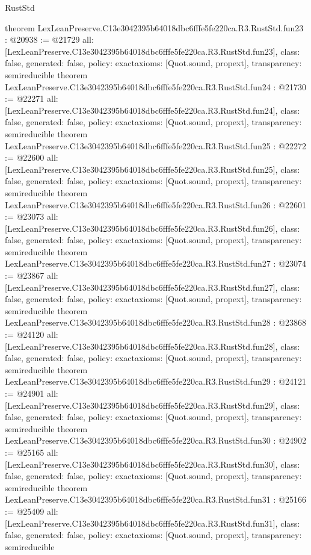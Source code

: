 \begin{lexlean}{RustStd}
\begin{coremodule}
{}
theorem LexLeanPreserve.C13e3042395b64018dbc6fffe5fe220ca.R3.RustStd.fun23 : @20938 := @21729 {
  all: [LexLeanPreserve.C13e3042395b64018dbc6fffe5fe220ca.R3.RustStd.fun23],
  class: false,
  generated: false,
  policy: exact{axioms: [Quot.sound, propext]},
  transparency: semireducible
}
theorem LexLeanPreserve.C13e3042395b64018dbc6fffe5fe220ca.R3.RustStd.fun24 : @21730 := @22271 {
  all: [LexLeanPreserve.C13e3042395b64018dbc6fffe5fe220ca.R3.RustStd.fun24],
  class: false,
  generated: false,
  policy: exact{axioms: [Quot.sound, propext]},
  transparency: semireducible
}
theorem LexLeanPreserve.C13e3042395b64018dbc6fffe5fe220ca.R3.RustStd.fun25 : @22272 := @22600 {
  all: [LexLeanPreserve.C13e3042395b64018dbc6fffe5fe220ca.R3.RustStd.fun25],
  class: false,
  generated: false,
  policy: exact{axioms: [Quot.sound, propext]},
  transparency: semireducible
}
theorem LexLeanPreserve.C13e3042395b64018dbc6fffe5fe220ca.R3.RustStd.fun26 : @22601 := @23073 {
  all: [LexLeanPreserve.C13e3042395b64018dbc6fffe5fe220ca.R3.RustStd.fun26],
  class: false,
  generated: false,
  policy: exact{axioms: [Quot.sound, propext]},
  transparency: semireducible
}
theorem LexLeanPreserve.C13e3042395b64018dbc6fffe5fe220ca.R3.RustStd.fun27 : @23074 := @23867 {
  all: [LexLeanPreserve.C13e3042395b64018dbc6fffe5fe220ca.R3.RustStd.fun27],
  class: false,
  generated: false,
  policy: exact{axioms: [Quot.sound, propext]},
  transparency: semireducible
}
theorem LexLeanPreserve.C13e3042395b64018dbc6fffe5fe220ca.R3.RustStd.fun28 : @23868 := @24120 {
  all: [LexLeanPreserve.C13e3042395b64018dbc6fffe5fe220ca.R3.RustStd.fun28],
  class: false,
  generated: false,
  policy: exact{axioms: [Quot.sound, propext]},
  transparency: semireducible
}
theorem LexLeanPreserve.C13e3042395b64018dbc6fffe5fe220ca.R3.RustStd.fun29 : @24121 := @24901 {
  all: [LexLeanPreserve.C13e3042395b64018dbc6fffe5fe220ca.R3.RustStd.fun29],
  class: false,
  generated: false,
  policy: exact{axioms: [Quot.sound, propext]},
  transparency: semireducible
}
theorem LexLeanPreserve.C13e3042395b64018dbc6fffe5fe220ca.R3.RustStd.fun30 : @24902 := @25165 {
  all: [LexLeanPreserve.C13e3042395b64018dbc6fffe5fe220ca.R3.RustStd.fun30],
  class: false,
  generated: false,
  policy: exact{axioms: [Quot.sound, propext]},
  transparency: semireducible
}
theorem LexLeanPreserve.C13e3042395b64018dbc6fffe5fe220ca.R3.RustStd.fun31 : @25166 := @25409 {
  all: [LexLeanPreserve.C13e3042395b64018dbc6fffe5fe220ca.R3.RustStd.fun31],
  class: false,
  generated: false,
  policy: exact{axioms: [Quot.sound, propext]},
  transparency: semireducible
}
\end{coremodule}
\end{lexlean}
